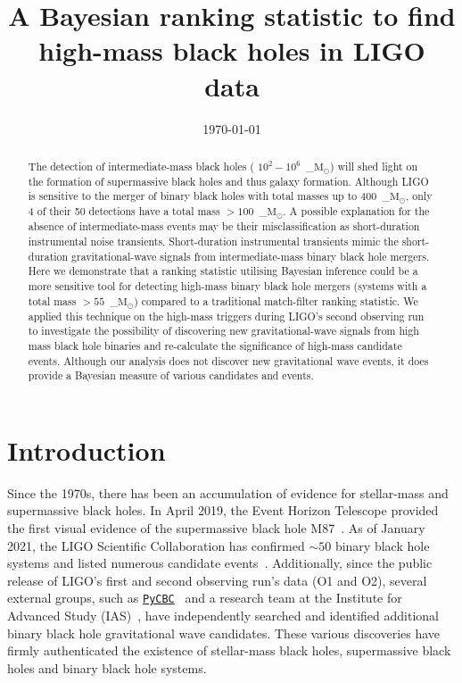 \documentclass[%
 nofootinbib,
 amsmath,amssymb,
 aps,
 twocolumn
]{revtex4-2}
\newcommand{\pycbc}{{\sc \href{https://pycbc.org/}{\texttt{PyCBC}}}\xspace}
\newcommand{\mathcmd}[1]{{\sc \relax\ifmmode#1\else $#1$\fi}\xspace}
\newcommand{\msun}{\mathcmd{\text{M}_\odot}}
\begin{document}
\title{A Bayesian ranking statistic to find \\high-mass black holes in LIGO data}



\date{\today}

\begin{abstract}
The detection of intermediate-mass black holes ( $10^2-10^6$~\msun) will shed light on the formation of supermassive black holes and thus galaxy formation. Although LIGO is sensitive to the merger of binary black holes with total masses up to $400$~\msun, only 4 of their 50 detections have a total mass $>100$~\msun. A possible explanation for the absence of intermediate-mass events may be their misclassification as short-duration instrumental noise transients. Short-duration instrumental transients mimic the short-duration gravitational-wave signals from intermediate-mass binary black hole mergers. Here we demonstrate that a ranking statistic utilising Bayesian inference could be a more sensitive tool for detecting high-mass binary black hole mergers (systems with a total mass $>55$~\msun) compared to a traditional match-filter ranking statistic. We applied this technique on the high-mass triggers during LIGO's second observing run to investigate the possibility of discovering new gravitational-wave signals from high mass black hole binaries and re-calculate the significance of high-mass candidate events. Although our analysis does not discover new gravitational wave events, it does provide a Bayesian measure of various candidates and events. 
\end{abstract}

\maketitle


\section{\label{sec:Introduction}Introduction}

Since the 1970s, there has been an accumulation of evidence for stellar-mass and supermassive black holes. In April 2019, the Event Horizon Telescope provided the first visual evidence of the supermassive black hole M87~\cite{m87photo}. As of January 2021, the LIGO Scientific Collaboration has confirmed $\sim50$ binary black hole systems and listed numerous candidate events~\cite{GWTC1, GWTC2, gracedb}. Additionally, since the public release of LIGO's first and second observing run's data (O1 and O2), several external groups, such as \pycbc~\cite{pycbc_code} and a research team at the Institute for Advanced Study (IAS)~\cite{IAS0, IAS1, IAS2}, have independently searched and identified additional binary black hole gravitational wave candidates. These various discoveries have firmly authenticated the existence of stellar-mass black holes, supermassive black holes and binary black hole systems.
\end{document}

